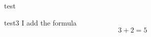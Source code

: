 \documentclass{article}
\begin{document}
test

test3
I add the formula
\begin{equation}
3+2=5
\end{equation}
\end{document}
